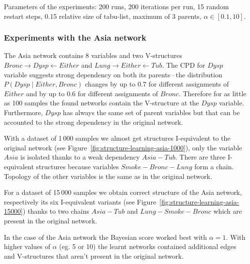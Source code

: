 \documentclass[english,cover]{fitthesis} %
\begin{document}
Parameters of the experiments: 200 runs, 200 iterations per run, 15 random restart steps, 0.15 relative size of tabu-list, maximum of 3 parents, $\alpha \in [0.1, 10]$.


\subsubsection{Experiments with the Asia network}
The Asia network contains 8 variables and two V-structures $Bronc \rightarrow Dysp \leftarrow Either$ and $Lung \rightarrow Either \leftarrow Tub$. The CPD for $Dysp$ variable suggests strong dependency on both its parents\,--\,the distribution $P(Dysp \mid Either, Bronc)$ changes by up to $0.7$ for different assignments of $Either$ and by up to $0.6$ for different assignments of $Bronc$. Therefore for as little as 100 samples the found networks contain the V-structure at the $Dysp$ variable. Furthermore, $Dysp$ has always the same set of parent variables but that can be accounted to the strong dependency in the original network.

With a dataset of 1\,000 samples we almost get structures I-equivalent to the original network (see Figure~\ref{fig:structure-learning-asia-1000}), only the variable $Asia$ is isolated thanks to a weak dependency $Asia - Tub$. There are three I-equivalent structures because variables $Smoke - Bronc - Lung$ form a chain. Topology of the other variables is the same as in the original network.

For a dataset of 15\,000 samples we obtain correct structure of the Asia network, respectively its six I-equivalent variants (see Figure~\ref{fig:structure-learning-asia-15000}) thanks to two chains $Asia - Tub$ and $Lung - Smoke - Bronc$ which are present in the original network.

In the case of the Asia network the Bayesian score worked best with $\alpha=1$. With higher values of $\alpha$ (eg. 5 or 10) the learnt networks contained additional edges and V-structures that aren't present in the original network.
\end{document}
